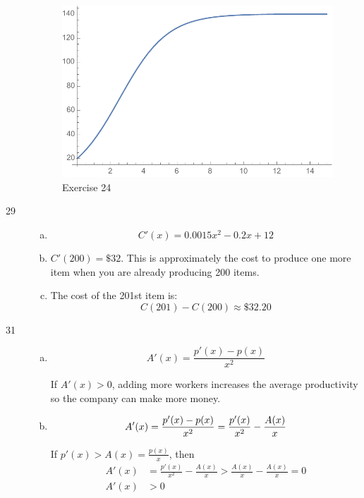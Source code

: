 \documentclass[letterpaper, landscape]{exam}
\begin{document}
\begin{description}
      \begin{figure}[H]
        \centering
        \includegraphics[scale = 0.5]{ex24}
        \caption{Exercise 24}
        \label{fig:ex24}
      \end{figure}


    \item[29]
      \begin{enumerate}[(a)]
        \item 
          \[
            C'(x) = 0.0015x^2 - 0.2x + 12
          \]

        \item $C'(200) = \$32$. This is approximately the cost to produce one
          more item when you are already producing 200 items.

        \item The cost of the 201st item is:
          \[
            C(201) - C(200) \approx \$32.20
          \]
      \end{enumerate}

    \item[31]
      \begin{enumerate}[(a)]
        \item 
          \[
            A'(x) = \frac{p'(x) - p(x)}{x^2} 
          \]

          If $A'(x) > 0$, adding more workers increases the average productivity
          so the company can make more money.

        \item 
          \[
            A'(x) = \frac{p'(x) - p(x)}{x^2} = \frac{p'(x)}{x^2} - \frac{A(x)}{x} \\
          \]

          If $p'(x) > A(x) = \frac{p(x)}{x}$, then
          \begin{align*}
            A'(x) & = \frac{p'(x)}{x^2} - \frac{A(x)}{x} > \frac{A(x)}{x} - \frac{A(x)}{x} = 0 \\
            A'(x) & > 0 \\
          \end{align*}


\end{enumerate}
\end{description}
\end{document}
